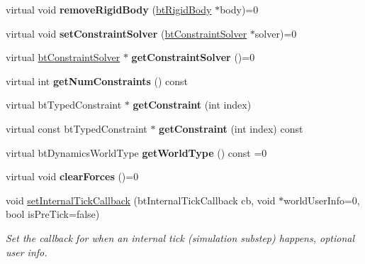 \begin{DoxyCompactItemize}
virtual void {\bfseries remove\+Rigid\+Body} (\hyperlink{classbtRigidBody}{bt\+Rigid\+Body} $\ast$body)=0
\item 
\mbox{\label{classbtDynamicsWorld_a65cd45eeb235a87516f4f22383ceac49}} 
virtual void {\bfseries set\+Constraint\+Solver} (\hyperlink{classbtConstraintSolver}{bt\+Constraint\+Solver} $\ast$solver)=0
\item 
\mbox{\label{classbtDynamicsWorld_af6179dea87b148971a2fed3c14ff052b}} 
virtual \hyperlink{classbtConstraintSolver}{bt\+Constraint\+Solver} $\ast$ {\bfseries get\+Constraint\+Solver} ()=0
\item 
\mbox{\label{classbtDynamicsWorld_a6578dac0bc85b792df55ebebd9feae61}} 
virtual int {\bfseries get\+Num\+Constraints} () const
\item 
\mbox{\label{classbtDynamicsWorld_a25547b26ffbe6659c34c7e021bc2e532}} 
virtual bt\+Typed\+Constraint $\ast$ {\bfseries get\+Constraint} (int index)
\item 
\mbox{\label{classbtDynamicsWorld_a2d54fd1821af1a614d431863807dee7e}} 
virtual const bt\+Typed\+Constraint $\ast$ {\bfseries get\+Constraint} (int index) const
\item 
\mbox{\label{classbtDynamicsWorld_a7c657a2757b38c533dd6b3a7110624e1}} 
virtual bt\+Dynamics\+World\+Type {\bfseries get\+World\+Type} () const =0
\item 
\mbox{\label{classbtDynamicsWorld_a9a9d474cc43c25095cd32e1c3332152a}} 
virtual void {\bfseries clear\+Forces} ()=0
\item 
\mbox{\label{classbtDynamicsWorld_a6974c869e196322377e2d8c078db5805}} 
void \hyperlink{classbtDynamicsWorld_a6974c869e196322377e2d8c078db5805}{set\+Internal\+Tick\+Callback} (bt\+Internal\+Tick\+Callback cb, void $\ast$world\+User\+Info=0, bool is\+Pre\+Tick=false)
\begin{DoxyCompactList}\small\item\em Set the callback for when an internal tick (simulation substep) happens, optional user info. \end{DoxyCompactList}\item 

\end{DoxyCompactItemize}
